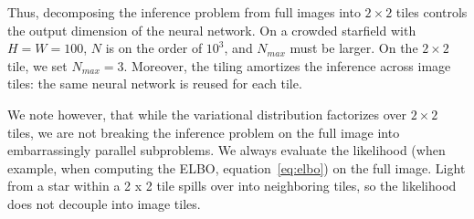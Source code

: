 Thus, decomposing the inference problem from full images into $2 \times 2$ tiles controls the output dimension of the neural network. 
On a crowded starfield with $H = W = 100$, $N$ is on the order of $10^3$, 
and $N_{max}$ must be larger. 
On the $2\times 2$ tile, we set $N_{max} = 3$. 
Moreover, the tiling amortizes the inference across image tiles: the same neural network is reused for each tile. 

We note however, that while the variational distribution factorizes over $2 \times 2$ tiles, we are not breaking the inference problem on the full image into embarrassingly parallel subproblems. We always evaluate the likelihood (when example, when computing the ELBO, equation~\eqref{eq:elbo}) on the full image.
Light from a star within a 2 x 2 tile spills over into neighboring tiles, so the likelihood does not decouple into image tiles. 
